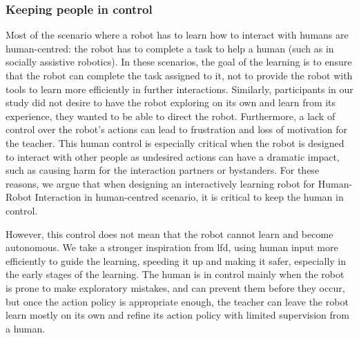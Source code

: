 \subsubsection{Keeping people in control}

Most of the scenario where a robot has to learn how to interact with humans are human-centred: the robot has to complete a task to help a human (such as in socially assistive robotics). In these scenarios, the goal of the learning is to ensure that the robot can complete the task assigned to it, not to provide the robot with tools to learn more efficiently in further interactions. Similarly, participants in our study did not desire to have the robot exploring on its own and learn from its experience, they wanted to be able to direct the robot. Furthermore, a lack of control over the robot's actions can lead to frustration and loss of motivation for the teacher. This human control is especially critical when the robot is designed to interact with other people as undesired actions can have a dramatic impact, such as causing harm for the interaction partners or bystanders. For these reasons, we argue that when designing an interactively learning robot for Human-Robot Interaction in human-centred scenario, it is critical to keep the human in control. 

However, this control does not mean that the robot cannot learn and become autonomous. We take a stronger inspiration from \gls{lfd}, using human input more efficiently to guide the learning, speeding it up and making it safer, especially in the early stages of the learning. The human is in control mainly when the robot is prone to make exploratory mistakes, and can prevent them before they occur, but once the action policy is appropriate enough, the teacher can leave the robot learn mostly on its own and refine its action policy with limited supervision from a human.


